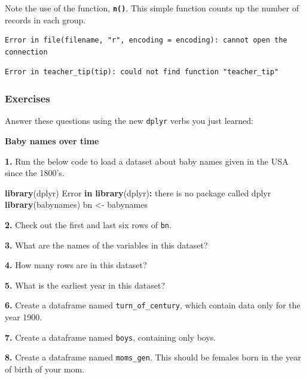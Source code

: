 \documentclass[
]{book}
\newenvironment{Shaded}{\begin{snugshade}}{\end{snugshade}}
\newcommand{\ControlFlowTok}[1]{\textcolor[rgb]{0.13,0.29,0.53}{\textbf{#1}}}
\newcommand{\FunctionTok}[1]{\textcolor[rgb]{0.13,0.29,0.53}{\textbf{#1}}}
\newcommand{\NormalTok}[1]{#1}
\newcommand{\OtherTok}[1]{\textcolor[rgb]{0.56,0.35,0.01}{#1}}
\newcommand{\SpecialCharTok}[1]{\textcolor[rgb]{0.81,0.36,0.00}{\textbf{#1}}}
\newcommand{\StringTok}[1]{\textcolor[rgb]{0.31,0.60,0.02}{#1}}
\begin{document}
Note the use of the function, \textbf{\texttt{n()}}. This simple function counts up the number of records in each group.

\begin{verbatim}
Error in file(filename, "r", encoding = encoding): cannot open the connection
\end{verbatim}

\begin{verbatim}
Error in teacher_tip(tip): could not find function "teacher_tip"
\end{verbatim}

\subsubsection*{Exercises}\label{exercises-9}

Answer these questions using the new \texttt{dplyr} verbs you just learned:

\textbf{Baby names over time}

\textbf{1.} Run the below code to load a dataset about baby names given in the USA since the 1800's.

\begin{Shaded}
\begin{Highlighting}[]
\FunctionTok{library}\NormalTok{(dplyr)}
\NormalTok{Error }\ControlFlowTok{in} \FunctionTok{library}\NormalTok{(dplyr)}\SpecialCharTok{:}\NormalTok{ there is no package called }\StringTok{\textquotesingle{}dplyr\textquotesingle{}}
\FunctionTok{library}\NormalTok{(babynames)}
\NormalTok{bn }\OtherTok{\textless{}{-}}\NormalTok{ babynames}
\end{Highlighting}
\end{Shaded}

\textbf{2.} Check out the first and last six rows of \texttt{bn}.

\textbf{3.} What are the names of the variables in this dataset?

\textbf{4.} How many rows are in this dataset?

\textbf{5.} What is the earliest year in this dataset?

\textbf{6.} Create a dataframe named \texttt{turn\_of\_century}, which contain data only for the year 1900.

\textbf{7.} Create a dataframe named \texttt{boys}, containing only boys.

\textbf{8.} Create a dataframe named \texttt{moms\_gen}. This should be females born in the year of birth of your mom.
\end{document}
